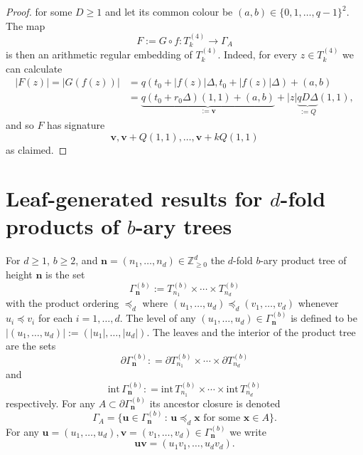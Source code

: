 \documentclass[11pt]{amsart}
\newcommand{\Z}{\mathbb{Z}}  %
\newcommand\labs[1]{\left\lvert#1\right\rvert}
\newcommand{\inte}{\mathrm{int}\,}
\renewcommand{\geq}{\geqslant}
\theoremstyle{plain}
\theoremstyle{definition}
\theoremstyle{remark}
\begin{document}
\begin{proof}
for some $D\geq 1$ and let its common colour be $(a,b) \in \{0,1,\ldots,q-1\}^2$. The map
\[ F:= G\circ f: T_k^{(4)} \to \Gamma_A\]
is then an arithmetic regular embedding of $T_k^{(4)}$. Indeed, for every $z\in T_k^{(4)}$ we can calculate
\begin{align*}
\labs{F(z)} = \labs{G(f(z))} &= q\left(t_0 + \labs{f(z)}\Delta,t_0 + \labs{f(z)}\Delta\right) + (a,b)\\
& = \underbrace{q(t_0 + r_0 \Delta)(1,1) + (a,b)}_{:=\mathbf{v}} + \labs{z} \underbrace{q D \Delta }_{:=Q}(1,1),
\end{align*}
and so $F$ has signature
\[ \mathbf{v}, \mathbf{v} + Q(1,1),\ldots, \mathbf{v} + kQ (1,1)\]
as claimed.
\end{proof}
\section{Leaf-generated results for \texorpdfstring{$d$}{d}-fold products of \texorpdfstring{$b$}{b}-ary trees}\label{Sec: general case}
For $d\geq1$, $b\geq2$, and $\mathbf n=(n_1,\ldots,n_d)\in \Z_{\geq 0}^d$ the $d$-fold $b$-ary product tree of height $\mathbf{n}$ is the set
\[\Gamma_{\mathbf n}^{(b)}:=T_{n_1}^{(b)}\times\cdots\times T_{n_d}^{(b)}\]
with the product ordering $\preceq_d$ where $(u_1,\ldots,u_d) \preceq_d (v_1,\ldots,v_d)$ whenever $u_i \preceq v_i$ for each $i=1,\ldots,d$. The level of any $(u_1,\ldots,u_d)\in \Gamma_{\mathbf{n}}^{(b)}$ is defined to be $\labs{(u_1,\ldots,u_d)} := (\labs{u_1},\ldots,\labs{u_d})$. The leaves and the interior of the product tree are the sets
\[ \partial \Gamma_{\mathbf{n}}^{(b)}: = \partial T_{n_1}^{(b)}\times \cdots \times \partial T_{n_d}^{(b)} \]
and
\[ \inte \Gamma_{\mathbf{n}}^{(b)}: = \inte T_{n_1}^{(b)} \times \cdots \times \inte T_{n_d}^{(b)}\]
respectively. For any $A\subset \partial \Gamma_{\mathbf{n}}^{(b)}$ its ancestor closure is denoted
\[ \Gamma_A = \{ \mathbf{u} \in \Gamma_{\mathbf{n}}^{(b)} \, : \, \mathbf{u} \preceq_d \mathbf{x} \text{ for some } \mathbf{x} \in A\}.\]  
For any $\mathbf{u}=(u_1,\ldots,u_d), \mathbf{v} = (v_1,\ldots,v_d) \in \Gamma_{\mathbf{n}}^{(b)}$ we write
\[ \mathbf{u}\mathbf{v} = (u_1 v_1,\ldots,u_d v_d).\]
\end{document}
